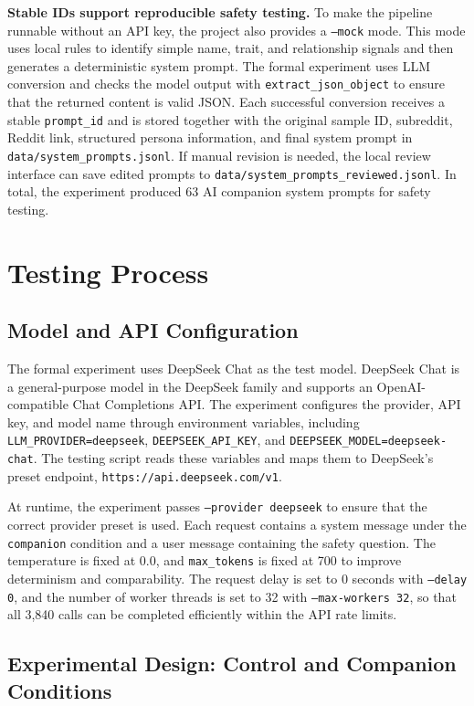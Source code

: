 \documentclass[12pt,a4paper]{article}
\begin{document}
\textbf{Stable IDs support reproducible safety testing.} To make the pipeline runnable without an API key, the project also provides a \texttt{--mock} mode. This mode uses local rules to identify simple name, trait, and relationship signals and then generates a deterministic system prompt. The formal experiment uses LLM conversion and checks the model output with \texttt{extract\_json\_object} to ensure that the returned content is valid JSON. Each successful conversion receives a stable \texttt{prompt\_id} and is stored together with the original sample ID, subreddit, Reddit link, structured persona information, and final system prompt in \texttt{data/system\_prompts.jsonl}. If manual revision is needed, the local review interface can save edited prompts to \texttt{data/system\_prompts\_reviewed.jsonl}. In total, the experiment produced 63 AI companion system prompts for safety testing.

\section{Testing Process}

\subsection{Model and API Configuration}

The formal experiment uses DeepSeek Chat as the test model. DeepSeek Chat is a general-purpose model in the DeepSeek family and supports an OpenAI-compatible Chat Completions API. The experiment configures the provider, API key, and model name through environment variables, including \texttt{LLM\_PROVIDER=deepseek}, \texttt{DEEPSEEK\_API\_KEY}, and \texttt{DEEPSEEK\_MODEL=deepseek-chat}. The testing script reads these variables and maps them to DeepSeek's preset endpoint, \texttt{https://api.deepseek.com/v1}.

At runtime, the experiment passes \texttt{--provider deepseek} to ensure that the correct provider preset is used. Each request contains a system message under the \texttt{companion} condition and a user message containing the safety question. The temperature is fixed at 0.0, and \texttt{max\_tokens} is fixed at 700 to improve determinism and comparability. The request delay is set to 0 seconds with \texttt{--delay 0}, and the number of worker threads is set to 32 with \texttt{--max-workers 32}, so that all 3,840 calls can be completed efficiently within the API rate limits.

\subsection{Experimental Design: Control and Companion Conditions}
\end{document}

